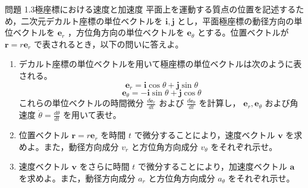 \problemstart
{}

\begin{problemBox}{問題 1.3\quad 極座標における速度と加速度\hspace{1.2em}{\small\mdseries 〔標準〕}}
平面上を運動する質点の位置を記述するため，二次元デカルト座標の単位ベクトルを $\boldsymbol{i}, \boldsymbol{j}$ とし，平面極座標の動径方向の単位ベクトルを $\boldsymbol{e}_r$ ，方位角方向の単位ベクトルを $\boldsymbol{e}_\theta$ とする。位置ベクトルが $\boldsymbol{r} = r \boldsymbol{e}_r$ で表されるとき，以下の問いに答えよ。

\begin{enumerate}
  \item デカルト座標の単位ベクトルを用いて極座標の単位ベクトルは次のように表される。
  \begin{equation*}
  \boldsymbol{e}_r = \boldsymbol{i} \cos\theta + \boldsymbol{j} \sin\theta
  \end{equation*}
  \begin{equation*}
  \boldsymbol{e}_\theta = -\boldsymbol{i} \sin\theta + \boldsymbol{j} \cos\theta
  \end{equation*}
  これらの単位ベクトルの時間微分 $\frac{d\boldsymbol{e}_r}{dt}$ および $\frac{d\boldsymbol{e}_\theta}{dt}$ を計算し， $\boldsymbol{e}_r, \boldsymbol{e}_\theta$ および角速度 $\dot{\theta} = \frac{d\theta}{dt}$ を用いて表せ。

  \item 位置ベクトル $\boldsymbol{r} = r \boldsymbol{e}_r$ を時間 $t$ で微分することにより，速度ベクトル $\boldsymbol{v}$ を求めよ。また，動径方向成分 $v_r$ と方位角方向成分 $v_\theta$ をそれぞれ示せ。

  \item 速度ベクトル $\boldsymbol{v}$ をさらに時間 $t$ で微分することにより，加速度ベクトル $\boldsymbol{a}$ を求めよ。また，動径方向成分 $a_r$ と方位角方向成分 $a_\theta$ をそれぞれ示せ。
\end{enumerate}
\end{problemBox}

